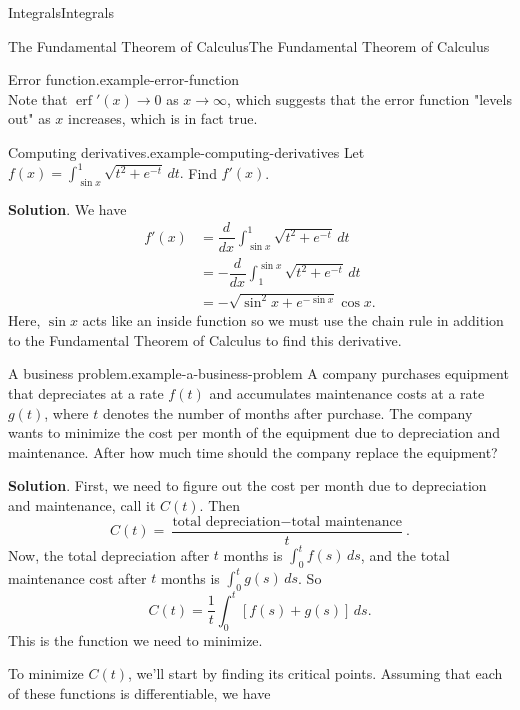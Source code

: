 \documentclass[10pt,]{book}
\numberwithin{equation}{section}
\newcommand{\dv}[3][]{\dfrac{d^{#1} #2}{d #3^{#1}}}
\newcommand{\erf}[1]{\operatorname{erf} #1}
\begin{document}
\begin{chapterptx}{Integrals}{}{Integrals}{}{}
\begin{sectionptx}{The Fundamental Theorem of Calculus}{}{The Fundamental Theorem of Calculus}{}{}
\begin{example}{Error function.}{example-error-function}
\begin{equation*}
\end{equation*}
Note that \(\erf'(x)\to0\) as \(x\to\infty\), which suggests that the error function "levels out" as \(x\) increases, which is in fact true.%
\end{example}
\begin{example}{Computing derivatives.}{example-computing-derivatives}%
\hypertarget{p-471}{}%
Let \(f(x) = \int_{\sin x}^{1}\sqrt{t^{2} + e^{-t}}\,dt.\) Find \(f'(x)\).%
\par\smallskip%
\noindent\textbf{Solution}.\hypertarget{solution-103}{}\quad%
\hypertarget{p-472}{}%
We have%
\begin{align*}
f'(x) & = \dv{}{x}\int_{\sin x}^{1}\sqrt{t^{2} + e^{-t}}\,dt \\
& = -\dv{}{x}\int_{1}^{\sin x}\sqrt{t^{2} + e^{-t}}\,dt \\
& = -\sqrt{\sin^{2}x+e^{-\sin x}}\cos x. 
\end{align*}
Here, \(\sin x\) acts like an inside function so we must use the chain rule in addition to the Fundamental Theorem of Calculus to find this derivative.%
\end{example}
\begin{example}{A business problem.}{example-a-business-problem}%
\hypertarget{p-473}{}%
A company purchases equipment that depreciates at a rate \(f(t)\) and accumulates maintenance costs at a rate \(g(t)\), where \(t\) denotes the number of months after purchase. The company wants to minimize the cost per month of the equipment due to depreciation and maintenance. After how much time should the company replace the equipment?%
\par\smallskip%
\noindent\textbf{Solution}.\hypertarget{solution-104}{}\quad%
\hypertarget{p-474}{}%
First, we need to figure out the cost per month due to depreciation and maintenance, call it \(C(t)\). Then%
\begin{equation*}
C(t) = \frac{\text{total depreciation} - \text{total maintenance}}{t}.
\end{equation*}
Now, the total depreciation after \(t\) months is \(\int_{0}^{t}f(s)\,ds\), and the total maintenance cost after \(t\) months is \(\int_{0}^{t}g(s)\,ds\). So%
\begin{equation*}
C(t) = \frac{1}{t}\int_{0}^{t}[f(s) + g(s)]\,ds.
\end{equation*}
This is the function we need to minimize.%
\par
\hypertarget{p-475}{}%
To minimize \(C(t)\), we'll start by finding its critical points. Assuming that each of these functions is differentiable, we have%

\end{example}
\end{sectionptx}
\end{chapterptx}
\end{document}
